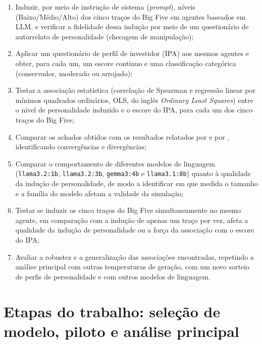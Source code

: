 \begin{enumerate}
    \item Induzir, por meio de instrução de sistema (\textit{prompt}),
    níveis (Baixo/Médio/Alto) dos cinco traços do Big Five em agentes
    baseados em LLM, e verificar a fidelidade dessa indução por meio de um
    questionário de autorrelato de personalidade (checagem de
    manipulação);
    \item Aplicar um questionário de perfil de investidor (IPA) aos
    mesmos agentes e obter, para cada um, um escore contínuo e uma
    classificação categórica (conservador, moderado ou arrojado);
    \item Testar a associação estatística (correlação de Spearman e
    regressão linear por mínimos quadrados ordinários, OLS, do inglês
    \textit{Ordinary Least Squares}) entre o nível de personalidade
    induzido e o escore do IPA, para cada um dos cinco traços do Big Five;
    \item Comparar os achados obtidos com os resultados relatados por
     e por ,
    identificando convergências e divergências;
    \item Comparar o comportamento de diferentes modelos de linguagem
    (\texttt{llama3.2:1b}, \texttt{llama3.2:3b}, \texttt{gemma3:4b} e
    \texttt{llama3.1:8b}) quanto à qualidade da indução de personalidade,
    de modo a identificar em que medida o tamanho e a família do modelo
    afetam a validade da simulação;
    \item Testar se induzir os cinco traços do Big Five simultaneamente no
    mesmo agente, em comparação com a indução de apenas um traço por vez,
    afeta a qualidade da indução de personalidade ou a força da associação
    com o escore do IPA;
    \item Avaliar a robustez e a generalização das associações encontradas,
    repetindo a análise principal com outras temperaturas de geração, com
    um novo sorteio de perfis de personalidade e com outros modelos de
    linguagem.
\end{enumerate}

\section{Etapas do trabalho: seleção de modelo, piloto e análise principal}
\label{sec:trabalho-realizado-intro}

